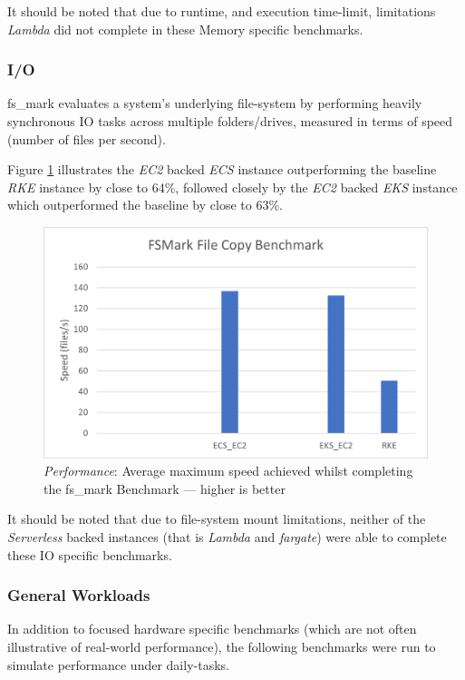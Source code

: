 \noindent \newline It should be noted that due to runtime, and execution time-limit, limitations \textit{Lambda} did not complete in these Memory specific benchmarks.

\subsubsection{I/O}
fs\_mark evaluates a system's underlying file-system by performing heavily synchronous IO tasks across multiple folders/drives, measured in terms of speed (number of files per second).

Figure \ref{fig:perf_FSMark} illustrates the \textit{EC2} backed \textit{ECS} instance outperforming the baseline \textit{RKE} instance by close to 64\%,
followed closely by the \textit{EC2} backed \textit{EKS} instance which outperformed the baseline by close to 63\%.

\begin{figure}[htbp]
  \includegraphics[width=\textwidth]{images/perf-FSMark.png}
  \caption{\emph{Performance}: Average maximum speed achieved whilst completing the fs\_mark Benchmark --- higher is better}
  \label{fig:perf_FSMark}
\end{figure}

\noindent \newline It should be noted that due to file-system mount limitations, neither of the \textit{Serverless} backed instances (that is \textit{Lambda} and \textit{fargate}) were able to complete these I\/O specific benchmarks.

\subsubsection{General Workloads}
In addition to focused hardware specific benchmarks (which are not often illustrative of real-world performance),
the following benchmarks were run to simulate performance under daily-tasks.


